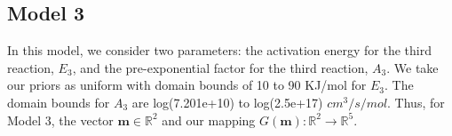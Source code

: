 \subsection{Model 3}


 In this model, we consider two parameters: the activation energy
 for the third reaction, $E_3$, and the pre-exponential factor for the
 third reaction, $A_3$.
 We take our priors
 as uniform with domain bounds of 10 to 90 KJ/mol for $E_3$. The domain bounds for $A_3$ are 
 log(7.201e+10) to log(2.5e+17) $cm^3/s/mol$. 
Thus, for Model 3, the vector
 $\mathbf{m} \in \mathbb{R}^2$ and our mapping $G(\mathbf{m}):
\mathbb{R}^2 \rightarrow \mathbb{R}^5$.














